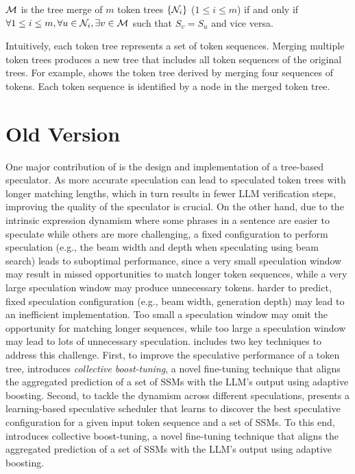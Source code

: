 \begin{definition}
$\mathcal{M}$ is the tree merge of $m$ token trees $\{\mathcal{N}_i\}$ ($1\leq i \leq m$) if and only if $\forall 1\leq i \leq m, \forall u \in \mathcal{N}_i, \exists v \in \mathcal{M}$ such that $S_v = S_u$ and vice versa.
\end{definition}

Intuitively, each token tree represents a set of token sequences. Merging multiple token trees produces a new tree that includes all token sequences of the original trees.
For example,  shows the token tree derived by merging four sequences of tokens. Each token sequence is identified by a node in the merged token tree.


\section*{Old Version}
One major contribution of \sys is the design and implementation of a tree-based speculator. 
As more accurate speculation can lead to speculated token trees with longer matching lengths, which in turn results in fewer LLM verification steps, improving the quality of the speculator is crucial. 
On the other hand, due to the intrinsic expression dynamism where some phrases in a sentence are easier to speculate while others are more challenging, a fixed configuration to perform speculation (e.g., the beam width and depth when speculating using beam search) leads to suboptimal performance, since a very small speculation window may result in missed opportunities to match longer token sequences, while a very large speculation window may produce unnecessary tokens.
harder to predict, fixed speculation configuration (e.g., beam width, generation depth) may lead to an inefficient implementation.
Too small a speculation window may omit the opportunity for matching longer sequences, while too large a speculation window may lead to lots of unnecessary speculation.
\fi
\Sys includes two key techniques to address this challenge. 
First, to improve the speculative performance of a token tree,  introduces {\em collective boost-tuning}, a novel fine-tuning technique that aligns the aggregated prediction of a set of SSMs with the LLM's output using adaptive boosting.
Second, to tackle the dynamism across different speculations,  presents a learning-based speculative scheduler that learns to discover the best speculative configuration for a given input token sequence and a set of SSMs. 
\fi
To this end, \Sys introduces collective boost-tuning, a novel fine-tuning technique that aligns the aggregated prediction of a set of SSMs with the LLM's output using adaptive boosting.

